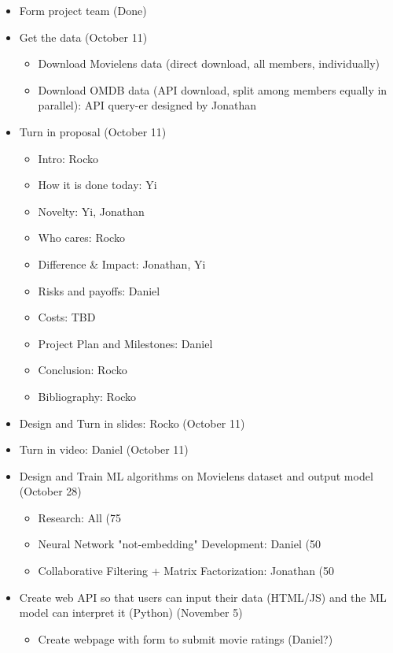 \begin{itemize}
  \item Form project team (Done)
  \item Get the data (October 11)
    \begin{itemize}
      \item Download Movielens data (direct download, all members, individually) 
      \item Download OMDB data (API download, split among members equally in parallel): API query-er designed by Jonathan
    \end{itemize}
  \item Turn in proposal (October 11)
    \begin{itemize}
      \item Intro: Rocko
      \item How it is done today: Yi
      \item Novelty: Yi, Jonathan
      \item Who cares: Rocko
      \item Difference & Impact: Jonathan, Yi
      \item Risks and payoffs: Daniel
      \item Costs: TBD
      \item Project Plan and Milestones: Daniel
      \item Conclusion: Rocko
      \item Bibliography: Rocko
    \end{itemize}
  \item Design and Turn in slides: Rocko (October 11)
  \item Turn in video: Daniel (October 11)
  \item Design and Train ML algorithms on Movielens dataset and output model (October 28)
    \begin{itemize}
      \item Research: All (75%
      \item Neural Network "not-embedding" Development: Daniel (50%
      \item Collaborative Filtering + Matrix Factorization: Jonathan (50%
    \end{itemize}
  \item Create web API so that users can input their data (HTML/JS) and the ML model can interpret it (Python) (November 5)
    \begin{itemize}
      \item Create webpage with form to submit movie ratings (Daniel?)

\end{itemize}
\end{itemize}
